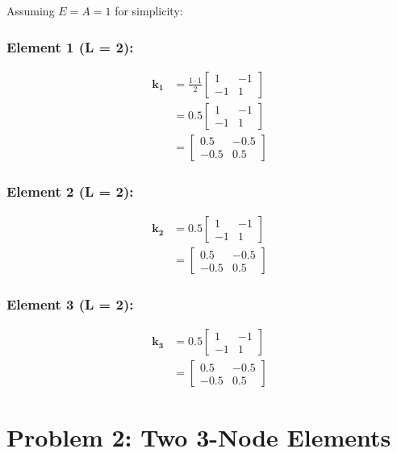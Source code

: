 \documentclass[12pt,a4paper]{article}
\begin{document}
Assuming $E = A = 1$ for simplicity:

\subsubsection*{Element 1 (L = 2):}
\begin{align}
\mathbf{k_1} &= \frac{1 \cdot 1}{2} \begin{bmatrix} 1 & -1 \\ -1 & 1 \end{bmatrix} \\
&= 0.5 \begin{bmatrix} 1 & -1 \\ -1 & 1 \end{bmatrix} \\
&= \begin{bmatrix} 0.5 & -0.5 \\ -0.5 & 0.5 \end{bmatrix}
\end{align}

\subsubsection*{Element 2 (L = 2):}
\begin{align}
\mathbf{k_2} &= 0.5 \begin{bmatrix} 1 & -1 \\ -1 & 1 \end{bmatrix} \\
&= \begin{bmatrix} 0.5 & -0.5 \\ -0.5 & 0.5 \end{bmatrix}
\end{align}

\subsubsection*{Element 3 (L = 2):}
\begin{align}
\mathbf{k_3} &= 0.5 \begin{bmatrix} 1 & -1 \\ -1 & 1 \end{bmatrix} \\
&= \begin{bmatrix} 0.5 & -0.5 \\ -0.5 & 0.5 \end{bmatrix}
\end{align}

\section{Problem 2: Two 3-Node Elements}
\end{document}
